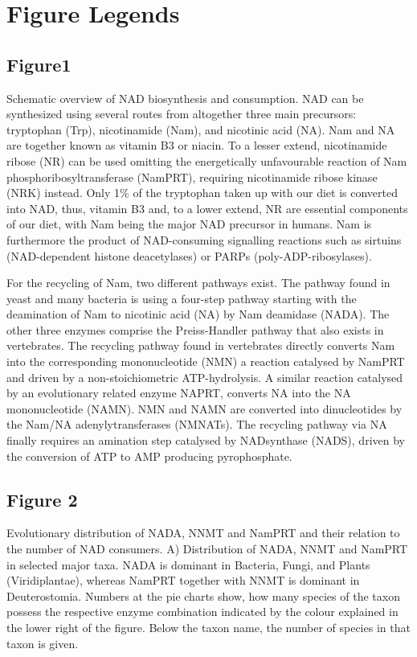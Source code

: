 

\section{Figure Legends}

\subsection{Figure1}

Schematic overview of NAD biosynthesis and consumption. NAD can be synthesized using several routes from altogether three main precursors: tryptophan (Trp), nicotinamide (Nam), and nicotinic acid (NA). Nam and NA are together known as vitamin B3 or niacin. To a lesser extend, nicotinamide ribose (NR) can be used omitting the energetically unfavourable reaction of Nam phosphoribosyltransferase (NamPRT), requiring nicotinamide ribose kinase (NRK) instead. Only 1\% of the tryptophan taken up with our diet is converted into NAD, thus, vitamin B3 and, to a lower extend, NR are essential components of our diet, with Nam being the major NAD precursor in humans. Nam is furthermore the product of NAD-consuming signalling reactions such as sirtuins (NAD-dependent histone deacetylases) or PARPs (poly-ADP-ribosylases).

For the recycling of Nam, two different pathways exist. The pathway found in yeast and many bacteria is using a four-step pathway starting with the deamination of Nam to nicotinic acid (NA) by Nam deamidase (NADA). The other three enzymes comprise the Preiss-Handler pathway that also exists in vertebrates. The recycling pathway found in vertebrates directly converts Nam into the corresponding mononucleotide (NMN) a reaction catalysed by NamPRT and driven by a non-stoichiometric ATP-hydrolysis. A similar reaction catalysed by an evolutionary related enzyme NAPRT, converts NA into the NA mononucleotide (NAMN). NMN and NAMN are converted into dinucleotides by the Nam/NA adenylytransferases (NMNATs). The recycling pathway via NA finally requires an amination step catalysed by NADsynthase (NADS), driven by the conversion of ATP to AMP producing pyrophosphate.


\subsection{Figure 2}

Evolutionary distribution of NADA, NNMT and NamPRT and their relation to the number of NAD consumers. A) Distribution of NADA, NNMT and NamPRT in selected major taxa. NADA is dominant in Bacteria, Fungi, and Plants (Viridiplantae), whereas NamPRT together with NNMT is dominant in Deuterostomia. Numbers at the pie charts show, how many species of the taxon possess the respective enzyme combination indicated by the colour explained in the lower right of the figure. Below the taxon name, the number of species in that taxon is given.

